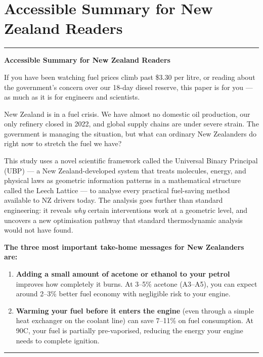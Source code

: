 \documentclass[12pt,a4paper]{article}
\newenvironment{accessibleenv}{%
  \vspace{8pt}\par%
  {\color{ubpblue}\rule{\linewidth}{2pt}}\par\vspace{2pt}%
  {\bfseries\large\color{ubpblue}Accessible Summary for New Zealand Readers}%
  \par\vspace{4pt}%
  \begin{list}{}{%
    \setlength{\leftmargin}{0.4cm}%
    \setlength{\rightmargin}{0.4cm}%
    \setlength{\listparindent}{0pt}%
    \setlength{\itemindent}{0pt}%
  }\item\relax%
}{%
  \end{list}%
  \par\vspace{2pt}%
  {\color{ubpblue}\rule{\linewidth}{2pt}}\par%
  \vspace{8pt}%
}
\begin{document}
\newpage

\section*{Accessible Summary for New Zealand Readers}

\begin{accessibleenv}
If you have been watching fuel prices climb past \$3.30 per litre, or reading about
the government's concern over our 18-day diesel reserve, this paper is for you ---
as much as it is for engineers and scientists.

New Zealand is in a fuel crisis. We have almost no domestic oil production, our only
refinery closed in 2022, and global supply chains are under severe strain. The
government is managing the situation, but what can ordinary New Zealanders do right
now to stretch the fuel we have?

This study uses a novel scientific framework called the Universal Binary Principal
(UBP) --- a New Zealand-developed system that treats molecules, energy, and physical
laws as geometric information patterns in a mathematical structure called the Leech
Lattice --- to analyse every practical fuel-saving method available to NZ drivers
today. The analysis goes further than standard engineering: it reveals \textit{why}
certain interventions work at a geometric level, and uncovers a new optimisation
pathway that standard thermodynamic analysis would not have found.

\textbf{The three most important take-home messages for New Zealanders are:}

\begin{enumerate}
  \item \textbf{Adding a small amount of acetone or ethanol to your petrol} improves
  how completely it burns. At 3--5\% acetone (A3--A5), you can expect around 2--3\%
  better fuel economy with negligible risk to your engine.

  \item \textbf{Warming your fuel before it enters the engine} (even through a simple
  heat exchanger on the coolant line) can save 7--11\% on fuel consumption. At
  90\textdegree C, your fuel is partially pre-vaporised, reducing the energy your
  engine needs to complete ignition.


\end{enumerate}
\end{accessibleenv}
\end{document}
